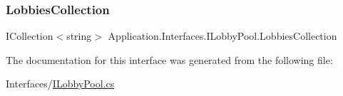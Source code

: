 \subsubsection{\texorpdfstring{Lobbies\+Collection}{LobbiesCollection}}
{\footnotesize\ttfamily I\+Collection$<$string$>$ Application.\+Interfaces.\+I\+Lobby\+Pool.\+Lobbies\+Collection\hspace{0.3cm}{\ttfamily [get]}}



The documentation for this interface was generated from the following file\+:\begin{DoxyCompactItemize}
\item 
Interfaces/\mbox{\hyperlink{_i_lobby_pool_8cs}{I\+Lobby\+Pool.\+cs}}\end{DoxyCompactItemize}
